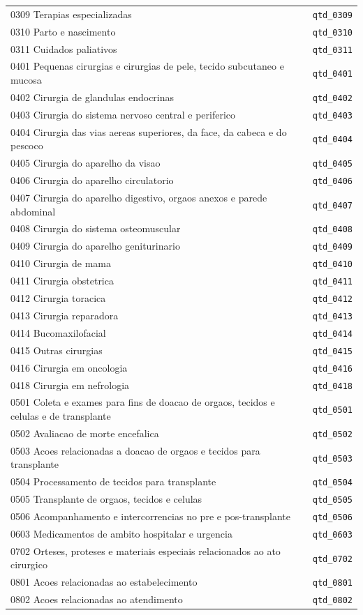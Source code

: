 \documentclass[12pt,a4paper]{report}
\begin{document}
\begin{longtable}{p{11.5cm} l}
0309 Terapias especializadas & \texttt{qtd\_0309} \\
0310 Parto e nascimento & \texttt{qtd\_0310} \\
0311 Cuidados paliativos & \texttt{qtd\_0311} \\
0401 Pequenas cirurgias e cirurgias de pele, tecido subcutaneo e mucosa & \texttt{qtd\_0401} \\
0402 Cirurgia de glandulas endocrinas & \texttt{qtd\_0402} \\
0403 Cirurgia do sistema nervoso central e periferico & \texttt{qtd\_0403} \\
0404 Cirurgia das vias aereas superiores, da face, da cabeca e do pescoco & \texttt{qtd\_0404} \\
0405 Cirurgia do aparelho da visao & \texttt{qtd\_0405} \\
0406 Cirurgia do aparelho circulatorio & \texttt{qtd\_0406} \\
0407 Cirurgia do aparelho digestivo, orgaos anexos e parede abdominal & \texttt{qtd\_0407} \\
0408 Cirurgia do sistema osteomuscular & \texttt{qtd\_0408} \\
0409 Cirurgia do aparelho geniturinario & \texttt{qtd\_0409} \\
0410 Cirurgia de mama & \texttt{qtd\_0410} \\
0411 Cirurgia obstetrica & \texttt{qtd\_0411} \\
0412 Cirurgia toracica & \texttt{qtd\_0412} \\
0413 Cirurgia reparadora & \texttt{qtd\_0413} \\
0414 Bucomaxilofacial & \texttt{qtd\_0414} \\
0415 Outras cirurgias & \texttt{qtd\_0415} \\
0416 Cirurgia em oncologia & \texttt{qtd\_0416} \\
0418 Cirurgia em nefrologia & \texttt{qtd\_0418} \\
0501 Coleta e exames para fins de doacao de orgaos, tecidos e celulas e de transplante & \texttt{qtd\_0501} \\
0502 Avaliacao de morte encefalica & \texttt{qtd\_0502} \\
0503 Acoes relacionadas a doacao de orgaos e tecidos para transplante & \texttt{qtd\_0503} \\
0504 Processamento de tecidos para transplante & \texttt{qtd\_0504} \\
0505 Transplante de orgaos, tecidos e celulas & \texttt{qtd\_0505} \\
0506 Acompanhamento e intercorrencias no pre e pos-transplante & \texttt{qtd\_0506} \\
0603 Medicamentos de ambito hospitalar e urgencia & \texttt{qtd\_0603} \\
0702 Orteses, proteses e materiais especiais relacionados ao ato cirurgico & \texttt{qtd\_0702} \\
0801 Acoes relacionadas ao estabelecimento & \texttt{qtd\_0801} \\
0802 Acoes relacionadas ao atendimento & \texttt{qtd\_0802} \\
\bottomrule
\end{longtable}
\end{document}
